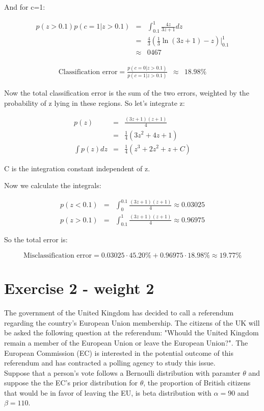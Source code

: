 \documentclass[a4paper]{article}
\begin{document}
And for c=1:

\begin{eqnarray}
p(z>0.1)p(c=1|z>0.1) &=& \int_{0.1}^{1} \frac{4z}{3z+1} dz\\
&=& \frac{4}{3}\left (\frac{1}{3} \ln(3z+1) - z\right ) \Bigg |_{0.1}^{1}\\
&\approx & 0467 
\end{eqnarray}

\begin{eqnarray}
\text{Classification error} = \frac{p(c=0|z>0.1)}{p(c=1|z>0.1)} &\approx & 18.98\%
\end{eqnarray}



Now the total classification error is the sum of the two errors, weighted by the probability of z lying in these regions. So let's integrate z:

\begin{eqnarray}
p(z) &=& \frac{(3z+1)(z+1)}{4}\\
&=& \frac{1}{4}(3z^2+4z+1)\\
\int p(z) dz &=& \frac{1}{4} \left (z^3 + 2z^2 + z + C\right )
\end{eqnarray}

C is the integration constant independent of z. 

Now we calculate the integrals:

\begin{eqnarray}
p(z<0.1) &=& \int_0^{0.1} \frac{(3z+1)(z+1)}{4} \approx 0.03025\\
p(z>0.1) &=& \int_{0.1}^{1} \frac{(3z+1)(z+1)}{4} \approx 0.96975
\end{eqnarray}

So the total error is:

\begin{equation}
\text{Misclassification error} = 0.03025\cdot 45.20\% + 0.96975\cdot 18.98\% \approx 19.77\%
\end{equation}


\section*{Exercise 2 - weight 2}

The government of the United Kingdom has decided to call a referendum regarding the country's European Union membership. The citizens of the UK will be asked the following question at the referendum: "Whould the United Kingdom remain a member of the European Union or leave the European Union?". The European Commission (EC) is interested in the potential outcome of this referendum and has contracted a polling agency to study this issue.\\
Suppose that a person's vote follows a Bernoulli distribution with paramter $\theta$ and suppose the the EC's prior distribution for $\theta$, the proportion of British citizens that would be in favor of leaving the EU, is beta distribution with $\alpha = 90$ and $\beta = 110$.
\end{document}
